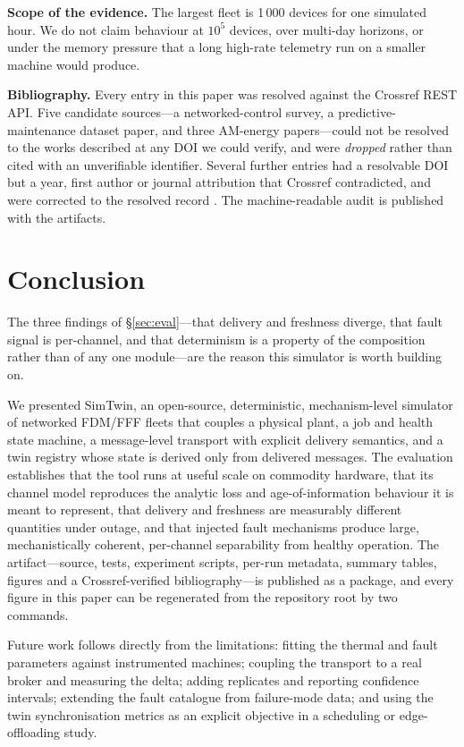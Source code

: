 \documentclass[preprint,12pt,authoryear,nopreprintline]{elsarticle}
\newcommand{\smt}{SimTwin}
\begin{document}
\textbf{Scope of the evidence.} The largest fleet is 1\,000 devices for one
simulated hour.
We do not claim behaviour at $10^{5}$ devices, over multi-day horizons, or under
the memory pressure that a long high-rate telemetry run on a smaller machine
would produce.

\textbf{Bibliography.} Every entry in this paper was resolved against the
Crossref REST API.
Five candidate sources---a networked-control survey, a predictive-maintenance
dataset paper, and three AM-energy papers---could not be resolved to the works
described at any DOI we could verify, and were \emph{dropped} rather than cited
with an unverifiable identifier.
Several further entries had a resolvable DOI but a year, first author or journal
attribution that Crossref contradicted, and were corrected to the resolved record
\citep{baumers2017jiec,liu2023dtms,grieves2016dt}.
The machine-readable audit is published with the artifacts.

\section{Conclusion}
\label{sec:conclusion}
The three findings of \S\ref{sec:eval}---that delivery and freshness diverge,
that fault signal is per-channel, and that determinism is a property of the
composition rather than of any one module---are the reason this simulator is worth
building on.

We presented \smt{}, an open-source, deterministic, mechanism-level simulator of
networked FDM/FFF fleets that couples a physical plant, a job and health state
machine, a message-level transport with explicit delivery semantics, and a twin
registry whose state is derived only from delivered messages.
The evaluation establishes that the tool runs at useful scale on commodity
hardware, that its channel model reproduces the analytic loss and
age-of-information behaviour it is meant to represent, that delivery and
freshness are measurably different quantities under outage, and that injected
fault mechanisms produce large, mechanistically coherent, per-channel
separability from healthy operation.
The artifact---source, tests, experiment scripts, per-run metadata, summary
tables, figures and a Crossref-verified bibliography---is published as a package,
and every figure in this paper can be regenerated from the repository root by two
commands.

Future work follows directly from the limitations: fitting the thermal and fault
parameters against instrumented machines; coupling the transport to a real broker
and measuring the delta; adding replicates and reporting confidence intervals;
extending the fault catalogue from failure-mode data; and using the twin
synchronisation metrics as an explicit objective in a scheduling or
edge-offloading study.
\end{document}
